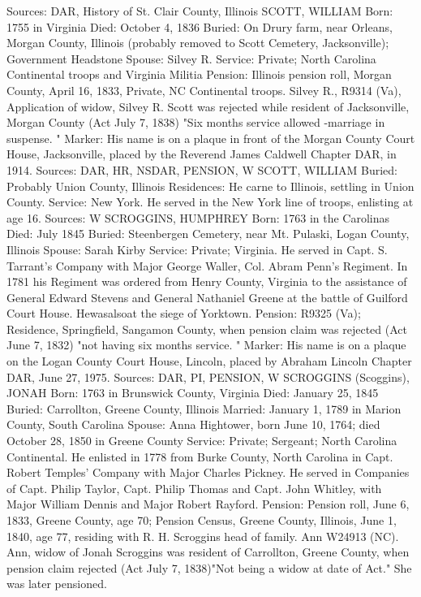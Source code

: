 Sources: DAR, History of St. Clair County, Illinois 
SCOTT, WILLIAM 
Born: 1755 in Virginia
Died: October 4, 1836
Buried: On Drury farm, near Orleans, Morgan County, Illinois (probably removed to Scott Cemetery, Jacksonville); Government Headstone
Spouse:  Silvey R. 
Service: Private; North Carolina Continental troops and Virginia Militia 
Pension: Illinois pension roll, Morgan County, April 16, 1833, Private, NC Con­tinental troops. Silvey  R., R9314 (Va), Application of widow, Silvey R. Scott was rejected while resident of Jacksonville, Morgan County (Act July 7, 1838) "Six months service allowed -marriage in suspense. " 
Marker: His name is on a plaque in front of the Morgan County Court House, Jacksonville, placed by the Reverend James Caldwell Chapter DAR, in 1914. 
Sources: DAR, HR, NSDAR, PENSION, W 
SCOTT, WILLIAM
Buried:  Probably Union County, Illinois 
Residences: He carne to Illinois, settling in Union County. 
Service: New York. He served in the New York line of troops, enlisting at age 16. 
Sources: W 
SCROGGINS, HUMPHREY 
Born: 1763 in the Carolinas 
Died: July 1845 
Buried: Steenbergen Cemetery, near Mt. Pulaski, Logan County, Illinois 
Spouse: Sarah Kirby 
Service: Private; Virginia. He served in Capt. S. Tarrant's Company with Major George Waller, Col. Abram Penn's Regiment. In 1781 his Regiment was ordered from Henry County, Virginia to the assistance of General Edward Stevens and General Nathaniel Greene at the battle of Guilford Court House. Hewasalsoat the siege of Yorktown. 
Pension: R9325 (Va); Residence, Springfield, Sangamon County, when pension claim was rejected (Act June 7, 1832) "not having six months service. " 
Marker: His name is on a plaque on the Logan County Court House, Lincoln, placed by Abraham Lincoln Chapter DAR, June 27, 1975. 
Sources: DAR, PI, PENSION, W 
SCROGGINS (Scoggins), JONAH
Born: 1763 in Brunswick County, Virginia 
Died: January 25, 1845 
Buried: Carrollton, Greene County, Illinois 
Married: January 1, 1789 in Marion County, South Carolina 
Spouse: Anna Hightower, born June 10, 1764; died October 28, 1850 in Greene County 
Service: Private; Sergeant; North Carolina Continental. He enlisted in 1778 from Burke County, North Carolina in Capt. Robert Temples' Company with Major Charles Pickney. He served in Companies of Capt. Philip Taylor, Capt. Philip Thomas and Capt. John Whitley, with Major William Dennis and Major Robert Rayford. 
Pension: Pension roll, June 6, 1833, Greene County, age 70; Pension Census, Greene County, Illinois, June 1, 1840, age 77, residing with R. H. Scroggins head of family.  Ann W24913 (NC). Ann, widow of Jonah Scroggins was resi­dent of Carrollton, Greene County, when pension claim rejected (Act July 7, 1838)"Not being a widow at date of Act." She was later pensioned. 

